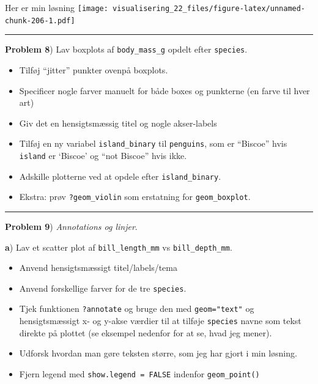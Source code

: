 \documentclass[
]{book}
\providecommand{\tightlist}{%
  \setlength{\itemsep}{0pt}\setlength{\parskip}{0pt}}
\begin{document}
Her er min løsning
\texttt{[image: visualisering\_22\_files/figure-latex/unnamed-chunk-206-1.pdf]}

\begin{center}\rule{0.5\linewidth}{0.5pt}\end{center}

\textbf{Problem 8}) Lav boxplots af \texttt{body\_mass\_g} opdelt efter \texttt{species}.

\begin{itemize}
\item
  Tilføj ``jitter'' punkter ovenpå boxplots.
\item
  Specificer nogle farver manuelt for både boxes og punkterne (en farve til hver art)
\item
  Giv det en hensigtsmæssig titel og nogle akser-labels
\item
  Tilføj en ny variabel \texttt{island\_binary} til \texttt{penguins}, som er ``Biscoe'' hvis \texttt{island} er `Biscoe' og ``not Biscoe'' hvis ikke.
\item
  Adskille plotterne ved at opdele efter \texttt{island\_binary}.
\item
  Ekstra: prøv \texttt{?geom\_violin} som erstatning for \texttt{geom\_boxplot}.
\end{itemize}

\begin{center}\rule{0.5\linewidth}{0.5pt}\end{center}

\textbf{Problem 9}) \emph{Annotations og linjer}.

\textbf{a}) Lav et scatter plot af \texttt{bill\_length\_mm} vs \texttt{bill\_depth\_mm}.

\begin{itemize}
\tightlist
\item
  Anvend hensigtsmæssigt titel/labels/tema
\item
  Anvend forskellige farver for de tre \texttt{species}.
\item
  Tjek funktionen \texttt{?annotate} og bruge den med \texttt{geom="text"} og hensigtsmæssigt x- og y-akse værdier til at tilføje \texttt{species} navne som tekst direkte på plottet (se eksempel nedenfor for at se, hvad jeg mener).
\item
  Udforsk hvordan man gøre teksten større, som jeg har gjort i min løsning.
\item
  Fjern legend med \texttt{show.legend\ =\ FALSE} indenfor \texttt{geom\_point()}
\end{itemize}
\end{document}
